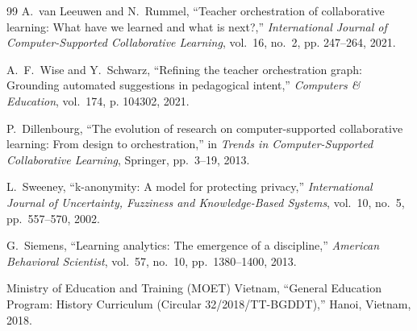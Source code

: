 \documentclass[11pt,a4paper]{article}
\begin{document}

\begin{thebibliography}{99}
A.~van Leeuwen and N.~Rummel, ``Teacher orchestration of collaborative learning: What have we learned and what is next?,'' \emph{International Journal of Computer-Supported Collaborative Learning}, vol.~16, no.~2, pp. 247--264, 2021.

A.~F.~Wise and Y.~Schwarz, ``Refining the teacher orchestration graph: Grounding automated suggestions in pedagogical intent,'' \emph{Computers \& Education}, vol.~174, p. 104302, 2021.

P.~Dillenbourg, ``The evolution of research on computer-supported collaborative learning: From design to orchestration,'' in \emph{Trends in Computer-Supported Collaborative Learning}, Springer, pp.~3--19, 2013.

L.~Sweeney, ``k-anonymity: A model for protecting privacy,'' \emph{International Journal of Uncertainty, Fuzziness and Knowledge-Based Systems}, vol.~10, no.~5, pp.~557--570, 2002.

G.~Siemens, ``Learning analytics: The emergence of a discipline,'' \emph{American Behavioral Scientist}, vol.~57, no.~10, pp.~1380--1400, 2013.

Ministry of Education and Training (MOET) Vietnam, ``General Education Program: History Curriculum (Circular 32/2018/TT-BGDDT),'' Hanoi, Vietnam, 2018.
\end{thebibliography}
\end{document}
